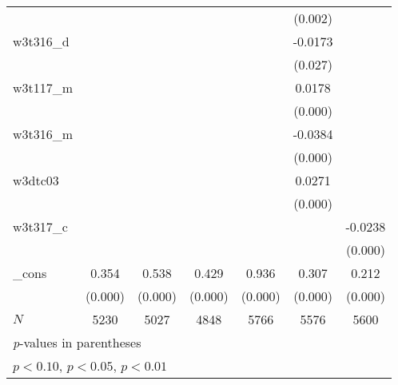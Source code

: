 {\begin{tabular}{l*{6}{c}}
            &                     &                     &                     &                     &     (0.002)         &                     \\
[1em]
w3t316\_d    &                     &                     &                     &                     &     -0.0173\sym{**} &                     \\
            &                     &                     &                     &                     &     (0.027)         &                     \\
[1em]
w3t117\_m    &                     &                     &                     &                     &      0.0178\sym{***}&                     \\
            &                     &                     &                     &                     &     (0.000)         &                     \\
[1em]
w3t316\_m    &                     &                     &                     &                     &     -0.0384\sym{***}&                     \\
            &                     &                     &                     &                     &     (0.000)         &                     \\
[1em]
w3dtc03     &                     &                     &                     &                     &      0.0271\sym{***}&                     \\
            &                     &                     &                     &                     &     (0.000)         &                     \\
[1em]
w3t317\_c    &                     &                     &                     &                     &                     &     -0.0238\sym{***}\\
            &                     &                     &                     &                     &                     &     (0.000)         \\
[1em]
\_cons      &       0.354\sym{***}&       0.538\sym{***}&       0.429\sym{***}&       0.936\sym{***}&       0.307\sym{***}&       0.212\sym{***}\\
            &     (0.000)         &     (0.000)         &     (0.000)         &     (0.000)         &     (0.000)         &     (0.000)         \\
\hline
\(N\)       &        5230         &        5027         &        4848         &        5766         &        5576         &        5600         \\
\hline\hline
\multicolumn{7}{l}{\footnotesize \textit{p}-values in parentheses}\\
\multicolumn{7}{l}{\footnotesize \sym{*} \(p<0.10\), \sym{**} \(p<0.05\), \sym{***} \(p<0.01\)}\\
\end{tabular}
}
